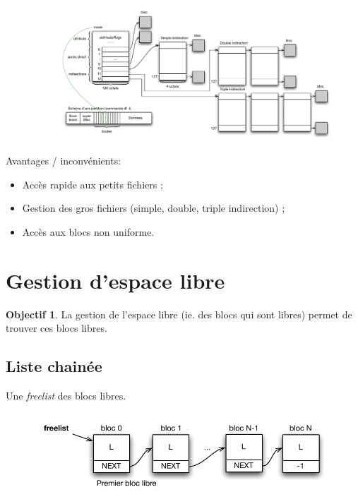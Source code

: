 \documentclass[11pt,english,french]{scrreprt}
\theoremstyle{remark}
\theoremstyle{definition}
\newtheorem*{obj*}{Objectif}
\newcommand*\Pitem{%
  \item[\color{green}\scalebox{0.9}{\textbullet}]}
\newcommand*\Citem{%
  \item[\color{red}\scalebox{0.9}{\textbullet}]}
\begin{document}
\begin{figure}[h!]
	\center
	\vspace{-15pt}
	\hspace{-40pt}\centerline{\includegraphics[scale=.7]{img/inode}}
	\vspace{-15pt}
\end{figure}

Avantages / inconvénients:
\begin{itemize}
	\Pitem Accès rapide aux petits fichiers ;
	\Pitem Gestion des gros fichiers (simple, double, triple indirection) ;
	\Citem Accès aux blocs non uniforme.
\end{itemize}

\section{Gestion d'espace libre}

\begin{obj*}
	La gestion de l'espace libre (ie. des blocs qui sont libres) permet de trouver ces blocs libres.
\end{obj*}

\subsection{Liste chainée}
Une \emph{freelist} des blocs libres.

\begin{figure}[h!]
	\center
	\vspace{-15pt}
	\includegraphics[scale=.85]{img/freelist-blocs}
	\vspace{-15pt}
\end{figure}
\end{document}

